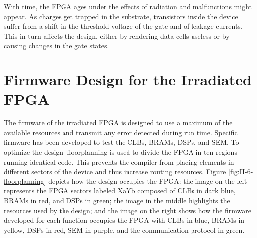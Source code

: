       With time, the FPGA ages under the effects of radiation and malfunctions might appear. As charges get trapped in the substrate, transistors inside the device suffer from a shift in the threshold voltage of the gate and of leakage currents. This in turn affects the design, either by rendering data cells useless or by causing changes in the gate states.

  \section{Firmware Design for the Irradiated FPGA}

    The firmware of the irradiated FPGA is designed to use a maximum of the available resources and transmit any error detected during run time. Specific firmware has been developed to test the CLBs, BRAMs, DSPs, and SEM. To optimize the design, floorplanning is used to divide the FPGA in ten regions running identical code. This prevents the compiler from placing elements in different sectors of the device and thus increase routing resources. Figure \ref{fig:II-6-floorplanning} depicts how the design occupies the FPGA: the image on the left represents the FPGA sectors labeled XaYb composed of CLBs in dark blue, BRAMs in red, and DSPs in green; the image in the middle highlights the resources used by the design; and the image on the right shows how the firmware developed for each function occupies the FPGA with CLBs in blue, BRAMs in yellow, DSPs in red, SEM in purple, and the communication protocol in green.

